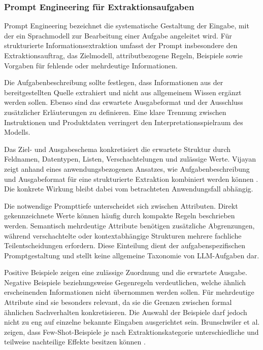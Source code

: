 \subsubsection{Prompt Engineering für Extraktionsaufgaben}

Prompt Engineering bezeichnet die systematische Gestaltung der Eingabe, mit der ein Sprachmodell zur Bearbeitung einer Aufgabe angeleitet wird. Für strukturierte 
Informationsextraktion umfasst der Prompt insbesondere den Extraktionsauftrag, das Zielmodell, attributbezogene Regeln, Beispiele sowie Vorgaben für fehlende oder 
mehrdeutige Informationen.

Die Aufgabenbeschreibung sollte festlegen, dass Informationen aus der bereitgestellten Quelle extrahiert und nicht aus allgemeinem Wissen ergänzt werden sollen. Ebenso 
sind das erwartete Ausgabeformat und der Ausschluss zusätzlicher Erläuterungen zu definieren. Eine klare Trennung zwischen Instruktionen und Produktdaten verringert den 
Interpretationsspielraum des Modells.

Das Ziel- und Ausgabeschema konkretisiert die erwartete Struktur durch Feldnamen, Datentypen, Listen, Verschachtelungen und zulässige Werte. Vijayan zeigt anhand eines 
anwendungsbezogenen Ansatzes, wie Aufgabenbeschreibung und Ausgabeformat für eine strukturierte Extraktion kombiniert werden können \cite{vijayan2023prompt}. Die konkrete 
Wirkung bleibt dabei vom betrachteten Anwendungsfall abhängig.

Die notwendige Prompttiefe unterscheidet sich zwischen Attributen. Direkt gekennzeichnete Werte können häufig durch kompakte Regeln beschrieben werden. Semantisch mehrdeutige 
Attribute benötigen zusätzliche Abgrenzungen, während verschachtelte oder kontextabhängige Strukturen mehrere fachliche Teilentscheidungen erfordern. Diese Einteilung dient 
der aufgabenspezifischen Promptgestaltung und stellt keine allgemeine Taxonomie von LLM-Aufgaben dar.

Positive Beispiele zeigen eine zulässige Zuordnung und die erwartete Ausgabe. Negative Beispiele beziehungsweise Gegenregeln verdeutlichen, welche ähnlich erscheinenden 
Informationen nicht übernommen werden sollen. Für mehrdeutige Attribute sind sie besonders relevant, da sie die Grenzen zwischen formal ähnlichen Sachverhalten konkretisieren. 
Die Auswahl der Beispiele darf jedoch nicht zu eng auf einzelne bekannte Eingaben ausgerichtet sein. Brunschwiler et al. zeigen, dass Few-Shot-Beispiele je nach 
Extraktionskategorie unterschiedliche und teilweise nachteilige Effekte besitzen können \cite{brunschwiler2025enhancing}.

